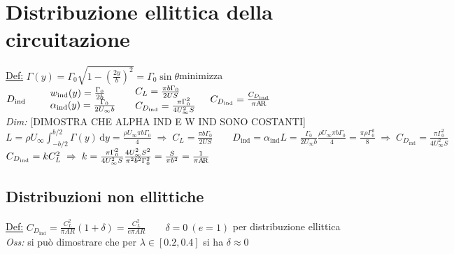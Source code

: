 \documentclass[11pt,a4paper]{report}
\newcommand{\de}{\mathrm d}
\begin{document}
	\section{Distribuzione ellittica della circuitazione}	\label{istr ell}
		\underline{Def:} $\Gamma(y)=\Gamma_0\sqrt{1-(\frac{2y}{b})^2}=\Gamma_0\sin\theta$\quad minimizza $D_\mathrm{ind}\qquad\begin{array}{l}w_\mathrm{ind}(y)=\frac{\Gamma_0}{2b}\\\alpha_\mathrm{ind}(y)=\frac{\Gamma_0}{2U_\infty b}\end{array}\quad\begin{array}{l}C_L=\frac{\pi b\Gamma_0}{2US}\\C_{D_\mathrm{ind}}=\frac{\pi\Gamma_0^2}{4U_\infty^2S}\end{array}\quad C_{D_\mathrm{ind}}=\frac{C_{D_\mathrm{ind}}}{\pi\text{A\!R}}$\\
	\textit{Dim:}  [DIMOSTRA CHE ALPHA IND E W IND SONO COSTANTI]\\
	$L=\rho U_\infty\int_{-b/2}^{b/2}\Gamma(y)\,\de y=\frac{\rho U_\infty\pi b\Gamma_0}{4}\;\Rightarrow\;C_L=\frac{\pi b\Gamma_0}{2US}\qquad D_\mathrm{ind}=\alpha_\mathrm{ind}L=\frac{\Gamma_0}{2U_\infty b}\frac{\rho U_\infty\pi b\Gamma_0}{4}=\frac{\pi\rho\Gamma_0^2}8\;\Rightarrow\;C_{D_\mathrm{ind}}=\frac{\pi\Gamma_0^2}{4U_\infty^2S}$\\$C_{D_\mathrm{ind}}=kC_L^2\;\Rightarrow\; k=\frac{\pi\Gamma_0^2}{4U_\infty^2S}\frac{4U_\infty^2S^2}{\pi^2b^2\Gamma_0^2}=\frac{S}{\pi b^2}=\frac 1{\pi\text{A\!R}}$
		\subsection{Distribuzioni non ellittiche}
		\underline{Def:} $C_{D_\mathrm{ind}}=\frac{C_L^2}{\pi A\!R}(1+\delta)=\frac{C_L^2}{e\pi A\!R}\qquad\delta=0\:(e=1)$ per distribuzione ellittica\\
		\textit{Oss:} si può dimostrare che per $\lambda\in[0.2,0.4]$ si ha $\delta\approx 0$
		
\end{document}
